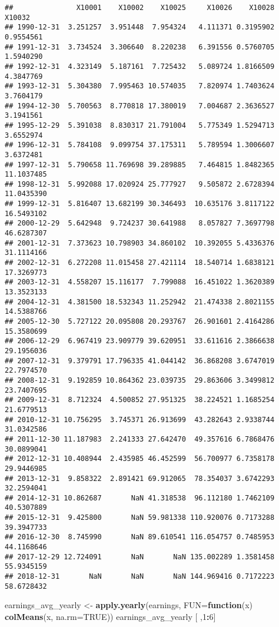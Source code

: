 \documentclass[
]{article}
\newenvironment{Shaded}{\begin{snugshade}}{\end{snugshade}}
\newcommand{\AttributeTok}[1]{\textcolor[rgb]{0.13,0.29,0.53}{#1}}
\newcommand{\ConstantTok}[1]{\textcolor[rgb]{0.56,0.35,0.01}{#1}}
\newcommand{\ControlFlowTok}[1]{\textcolor[rgb]{0.13,0.29,0.53}{\textbf{#1}}}
\newcommand{\DecValTok}[1]{\textcolor[rgb]{0.00,0.00,0.81}{#1}}
\newcommand{\FunctionTok}[1]{\textcolor[rgb]{0.13,0.29,0.53}{\textbf{#1}}}
\newcommand{\NormalTok}[1]{#1}
\newcommand{\OtherTok}[1]{\textcolor[rgb]{0.56,0.35,0.01}{#1}}
\newcommand{\SpecialCharTok}[1]{\textcolor[rgb]{0.81,0.36,0.00}{\textbf{#1}}}
\begin{document}
\begin{verbatim}
##               X10001    X10002    X10025     X10026    X10028     X10032
## 1990-12-31  3.251257  3.951448  7.954324   4.111371 0.3195902  0.9554561
## 1991-12-31  3.734524  3.306640  8.220238   6.391556 0.5760705  1.5940290
## 1992-12-31  4.323149  5.187161  7.725432   5.089724 1.8166509  4.3847769
## 1993-12-31  5.304380  7.995463 10.574035   7.820974 1.7403624  3.7604179
## 1994-12-30  5.700563  8.770818 17.380019   7.004687 2.3636527  3.1941561
## 1995-12-29  5.391038  8.830317 21.791004   5.775349 1.5294713  3.6552974
## 1996-12-31  5.784108  9.099754 37.175311   5.789594 1.3006607  3.6372481
## 1997-12-31  5.790658 11.769698 39.289885   7.464815 1.8482365 11.1037485
## 1998-12-31  5.992088 17.020924 25.777927   9.505872 2.6728394 11.0435390
## 1999-12-31  5.816407 13.682199 30.346493  10.635176 3.8117122 16.5493102
## 2000-12-29  5.642948  9.724237 30.641988   8.057827 7.3697798 46.6287307
## 2001-12-31  7.373623 10.798903 34.860102  10.392055 5.4336376 31.1114166
## 2002-12-31  6.272208 11.015458 27.421114  18.540714 1.6838121 17.3269773
## 2003-12-31  4.558207 15.116177  7.799088  16.451022 1.3620389 13.3523133
## 2004-12-31  4.381500 18.532343 11.252942  21.474338 2.8021155 14.5388766
## 2005-12-30  5.727122 20.095808 20.293767  26.901601 2.4164286 15.3580699
## 2006-12-29  6.967419 23.909779 39.620951  33.611616 2.3866638 29.1956036
## 2007-12-31  9.379791 17.796335 41.044142  36.868208 3.6747019 22.7974570
## 2008-12-31  9.192859 10.864362 23.039735  29.863606 3.3499812 23.7407695
## 2009-12-31  8.712324  4.500852 27.951325  38.224521 1.1685254 21.6779513
## 2010-12-31 10.756295  3.745371 26.913699  43.282643 2.9338744 31.0342586
## 2011-12-30 11.187983  2.241333 27.642470  49.357616 6.7868476 30.0899041
## 2012-12-31 10.408944  2.435985 46.452599  56.700977 6.7358178 29.9446985
## 2013-12-31  9.858322  2.891421 69.912065  78.354037 3.6742293 32.2594041
## 2014-12-31 10.862687       NaN 41.318538  96.112180 1.7462109 40.5307889
## 2015-12-31  9.425800       NaN 59.981338 110.920076 0.7173288 39.3947733
## 2016-12-30  8.745990       NaN 89.610541 116.054757 0.7485953 44.1168646
## 2017-12-29 12.724091       NaN       NaN 135.002289 1.3581458 55.9345159
## 2018-12-31       NaN       NaN       NaN 144.969416 0.7172223 58.6728432
\end{verbatim}

\begin{Shaded}
\begin{Highlighting}[]
\NormalTok{earnings\_avg\_yearly }\OtherTok{\textless{}{-}} \FunctionTok{apply.yearly}\NormalTok{(earnings, }\AttributeTok{FUN=}\ControlFlowTok{function}\NormalTok{(x) }\FunctionTok{colMeans}\NormalTok{(x, }\AttributeTok{na.rm=}\ConstantTok{TRUE}\NormalTok{))}
\NormalTok{earnings\_avg\_yearly [ ,}\DecValTok{1}\SpecialCharTok{:}\DecValTok{6}\NormalTok{]}
\end{Highlighting}
\end{Shaded}
\end{document}
